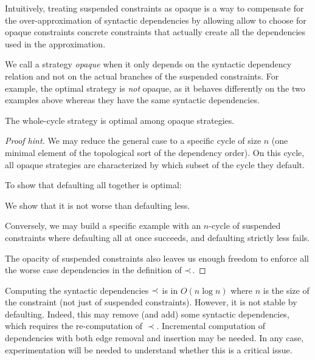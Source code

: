 Intuitively, treating suspended constraints as opaque is a way to compensate
for the over-approxi\-mation of syntactic dependencies by allowing allow to
choose for opaque constraints concrete constraints that actually create
all the dependencies used in the approximation.

We call a strategy \emph{opaque} when it only depends on the syntactic
dependency relation and not on the actual branches of the suspended
constraints.
%
For example, the optimal strategy is \emph{not} opaque, as it behaves
differently on the two examples above whereas they have the same syntactic
dependencies.

\begin{property}
The whole-cycle strategy is optimal among opaque strategies.
\end{property}
\begin{proof}[Proof hint]{}
We may reduce the general case to a specific cycle of size $n$
(one minimal element of the topological sort of the dependency order).
On this cycle, all opaque strategies are characterized by which subset of
the cycle they default.

To show that defaulting all together is optimal:
\begin{enumerate*}

\item
  We show that it is not worse than defaulting less.
\item
  Conversely, we may build a specific example with an $n$-cycle of
  suspended constraints where defaulting all at once succeeds, and
  defaulting strictly less fails.

\end{enumerate*}
The opacity of suspended constraints also leaves us enough freedom to
enforce all the worse case dependencies in the definition of $\prec_{}$.
\end{proof}

\begin{version}{\Draft}
Computing the syntactic dependencies $\prec_{}$ is in $O(n \log n)$ where $n$
is the size of the constraint (not just of suspended constraints).  However,
it is not stable by defaulting. Indeed, this may remove (and add) some
syntactic dependencies, which requires the re-computation of $\prec$.
Incremental computation of dependencies with both edge removal and insertion
may be needed. In any case, experimentation will be needed to
understand whether this is a critical issue.
\end{version}

